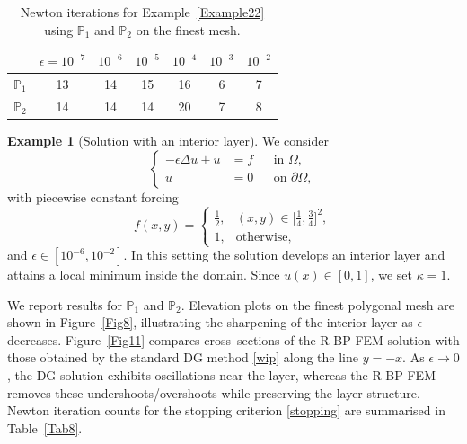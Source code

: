 \documentclass[11pt,final]{amsart}
\theoremstyle{plain}
\theoremstyle{definition}
\newtheorem{example}{Example}
\begin{document}
\begin{table}[H]
  \centering
  \begin{tabular}{|c|c|c|c|c|c|c|}
    \hline
     & $\epsilon=10^{-7}$ & $10^{-6}$ & $10^{-5}$ & $10^{-4}$ & $10^{-3}$ & $10^{-2}$ \\
    \hline\hline
    $\mathbb{P}_{1}$ & 13 & 14 & 15 & 16 & 6 & 7 \\
    $\mathbb{P}_{2}$ & 14 & 14 & 14 & 20 & 7 & 8 \\
    \hline
  \end{tabular}
  \caption{Newton iterations for Example~\ref{Example22} using $\mathbb{P}_{1}$ and $\mathbb{P}_{2}$ on the finest mesh.}
  \label{Tab7}
\end{table}


\begin{example}[Solution with an interior layer]\label{Example33}
  We consider
  \begin{equation}
    \left\{
    \begin{aligned}
      -\epsilon \Delta u + u &= f && \text{in }\Omega,\\
      u &= 0 && \text{on } \partial\Omega,
    \end{aligned}
    \right.
    \label{Example3}
  \end{equation}
  with piecewise constant forcing
  \[
  f(x,y)=
  \begin{cases}
    \tfrac{1}{2}, & (x,y)\in \big[\tfrac{1}{4},\tfrac{3}{4}\big]^2,\\[2pt]
    1,            & \text{otherwise},
  \end{cases}
  \]
  and $\epsilon \in [10^{-6},10^{-2}]$. In this setting the solution develops an interior layer and attains
  a local minimum inside the domain. Since $u(x)\in [0,1]$, we set $\kappa=1$.
\end{example}

We report results for $\mathbb{P}_{1}$ and $\mathbb{P}_{2}$. Elevation plots on the finest polygonal mesh are shown in Figure~\ref{Fig8}, illustrating the sharpening of the interior layer as $\epsilon$ decreases. Figure~\ref{Fig11} compares cross–sections of the R-BP-FEM solution with those obtained by the standard DG method \eqref{wip} along the line $y=-x$. As $\epsilon\to 0$, the DG solution exhibits oscillations near the layer, whereas the R-BP-FEM removes these undershoots/overshoots while preserving the layer structure. Newton iteration counts for the stopping criterion \eqref{stopping} are summarised in Table~\ref{Tab8}.
\end{document}
